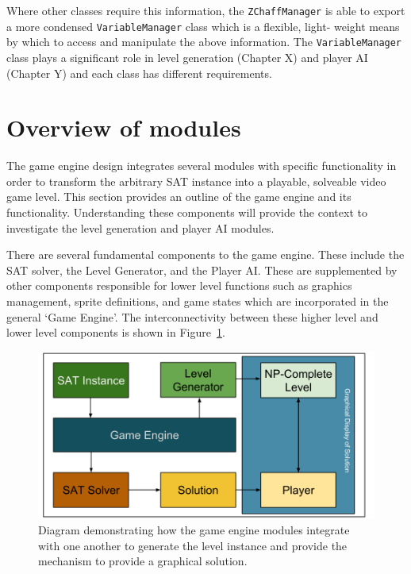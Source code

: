 \documentclass[11pt, a4paper, oneside]{report} %
\begin{document}
Where other classes require this information, the \texttt{ZChaffManager} is able
to export a more condensed \texttt{VariableManager} class which is a flexible,
light- weight means by which to access and manipulate the above information. The
\texttt{VariableManager} class plays a significant role in level generation
(Chapter X) and player AI (Chapter Y) and each class has different requirements.


\section{Overview of modules}

The game engine design integrates several modules with specific functionality in
order to transform the arbitrary SAT instance into a playable, solveable video
game level. This section provides an outline of the game engine and its
functionality. Understanding these components will provide the context to
investigate the level generation and player AI modules.

There are several fundamental components to the game engine. These include the
SAT solver, the Level Generator, and the Player AI. These are supplemented by
other components responsible for lower level functions such as graphics
management, sprite definitions, and game states which are incorporated in the
general `Game Engine'. The interconnectivity between these higher level and
lower level components is shown in Figure~\ref{modules}.

\begin{figure}[ht!]

  \centering
    \includegraphics[scale=0.40]{modules2}
  \caption{Diagram demonstrating how the game engine modules integrate with one another to generate the level instance and provide the mechanism to provide a graphical solution.}
  \label{modules}
\end{figure}
\end{document}
